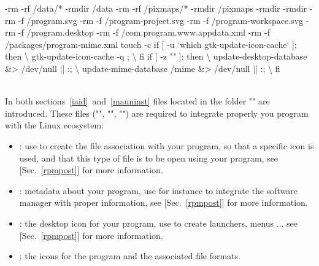 {\footnotesize{
\begin{script}
\tabul -rm -rf /data/*
\tabul -rmdir /data
\tabul -rm -rf /pixmaps/*
\tabul -rmdir /pixmaps
\tabul -rmdir 
\tabul -rmdir 
\tabul -rm -f /program.svg
\tabul -rm -f /program-project.svg
\tabul -rm -f /program-workspace.svg
\tabul -rm -f /program.desktop
\tabul -rm -f /com.program.www.appdata.xml
\tabul -rm -f /packages/program-mime.xml
\tabul touch -c 
\tabul if [ -u `which gtk-update-icon-cache` ]; then \textbackslash
\tabul   gtk-update-icon-cache -q ; \textbackslash
\tabul fi
\tabul if [ -z "" ]; then \textbackslash
\tabul \tabul update-desktop-database  &> /dev/null || :; \textbackslash
\tabul \tabul update-mime-database /mime &> /dev/null || :; \textbackslash
\tabul fi
\end{script}
}}
\\
\noindent In both sections~\ref{iaid}~and~\ref{mauninst} files located in the folder "" are introduced.
These files ("", "", "") are required to integrate properly you program with the Linux ecosystem:
\begin{itemize}
\item {}: use to create the file association with your program, so that a specific icon is used, and that this type of file is to be open using your program, see [Sec.~\ref{rpmpost}] for more information. 
\item {}: metadata about your program, use for instance to integrate the software manager with proper information, see [Sec.~\ref{rpmpost}] for more information.
\item {}: the desktop icon for your program, use to create launchers, menus ... see [Sec.~\ref{rpmpost}] for more information.
\item {}: the icons for the program and the associated file formats.
\end{itemize}

